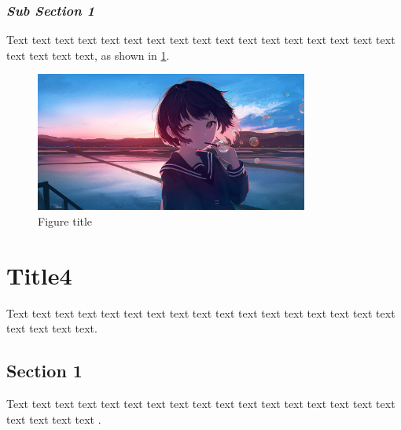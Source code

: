 \documentclass[12pt,a4paper]{article}
\numberwithin{equation}{section}
\begin{document}
{{\subsubsection{\textit{Sub Section 1}}
\hspace{2em}Text text text text text text text text text text text text text text text text text text text text text, as shown in \cref{fig:3- 1}.
\begin{figure}[h]
    \centering
    \includegraphics[width=0.8\textwidth, height=0.8\textwidth]{Fig example.png}
    \caption{Figure title}
    \label{fig:3- 1}
\end{figure}

\section{Title4}
\hspace{2em}Text text text text text text text text text text text text text text text text text text text text text.
\subsection{Section 1}
Text text text text text text text text text text text text text text text text text text text text text \cite{5}.
}}
\end{document}
